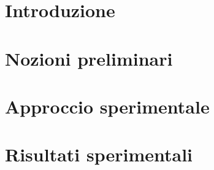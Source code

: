 \documentclass[a4paper,12pt]{book}
\begin{document}

\thispagestyle{empty} %
\cleardoublepage


\thispagestyle{empty}

\clearpage{\pagestyle{plain}\cleardoublepage}
\tableofcontents %

\clearpage{\pagestyle{plain}\cleardoublepage} %

\clearpage{\pagestyle{plain}\cleardoublepage} %
\chapter*{Introduzione} %
\label{chapter:zero} %

\clearpage{\pagestyle{plain}\cleardoublepage} %
\chapter{Nozioni preliminari} %
\label{chapter:primo} %

\clearpage{\pagestyle{plain}\cleardoublepage} %
\chapter{Approccio sperimentale} %
\label{chapter:secondo} %

\clearpage{\pagestyle{plain}\cleardoublepage} %
\chapter{Risultati sperimentali} %
\label{chapter:terzo} %
\end{document}
